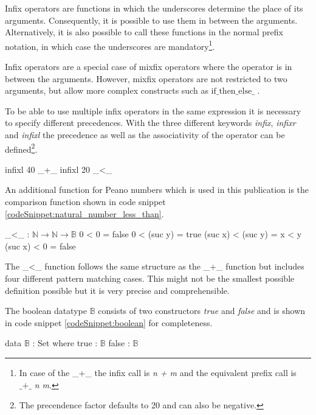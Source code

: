 Infix operators are functions in which the underscores determine the place of its arguments. Consequently, it is possible to use them in between the arguments.
Alternatively, it is also possible to call these functions in the normal prefix notation, in which case the underscores are mandatory\footnote{In case of the \_+\_ the infix call is \emph{n + m} and the equivalent prefix call is $\text{\_+\_}$ \emph{n m}.}.

Infix operators are a special case of mixfix operators where the operator is in between the arguments.
However, mixfix operators are not restricted to two arguments, but allow more complex constructs such as $\text{if\_then\_else\_}$ \cite{AgdaReadTheDocs}.

To be able to use multiple infix operators in the same expression it is necessary to specify different precedences.
With the three different keywords \emph{infix}, \emph{infixr} and \emph{infixl} the precedence as well as the associativity of the operator can be defined\footnote{The precendence factor defaults to 20 and can also be negative.}.

\begin{codesnippet}[mathescape=true, caption={Precedence and associativity of Peano number operators}, label={codeSnippet:natural_number_precedence}]
infixl 40 _+_
infixl 20 _<_
\end{codesnippet}

An additional function for Peano numbers which is used in this publication is the comparison function shown in code snippet \ref{codeSnippet:natural_number_less_than}.

\begin{codesnippet}[mathescape=true, caption={Less-than function for Peano numbers}, label={codeSnippet:natural_number_less_than}]
_<_ : $\mathbb{N} \rightarrow \mathbb{N} \rightarrow \mathbb{B}$
0 < 0 = false
0 < (suc y) = true
(suc x) < (suc y) = x < y
(suc x) < 0 = false
\end{codesnippet}

The \_\textless\_ function follows the same structure as the \_+\_ function but includes four different pattern matching cases. 
This might not be the smallest possible definition possible but it is very precise and comprehensible.

The boolean datatype $\mathbb{B}$ consists of two constructors \emph{true} and \emph{false} and is shown in code snippet \ref{codeSnippet:boolean} for completeness.

\begin{codesnippet}[mathescape=true, caption={Boolean datatype}, label={codeSnippet:boolean}]
data $\mathbb{B}$ : Set where
  true : $\mathbb{B}$
  false  : $\mathbb{B}$
\end{codesnippet}

